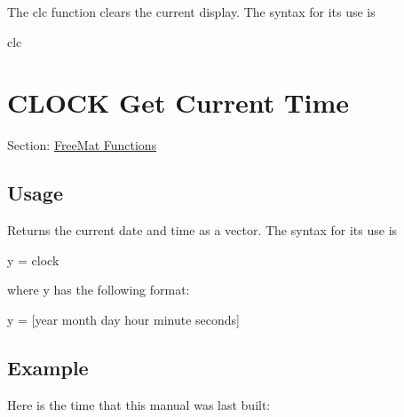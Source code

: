 The {\ttfamily clc} function clears the current display. The syntax for its use is \begin{DoxyVerb}   clc
\end{DoxyVerb}
 \hypertarget{freemat_clock}{}\section{C\-L\-O\-C\-K Get Current Time}\label{freemat_clock}
Section\-: \hyperlink{sec_freemat}{Free\-Mat Functions} \hypertarget{vtkwidgets_vtkxyplotwidget_Usage}{}\subsection{Usage}\label{vtkwidgets_vtkxyplotwidget_Usage}
Returns the current date and time as a vector. The syntax for its use is \begin{DoxyVerb}   y = clock
\end{DoxyVerb}
 where {\ttfamily y} has the following format\-: \begin{DoxyVerb}   y = [year month day hour minute seconds]
\end{DoxyVerb}
 \hypertarget{variables_struct_Example}{}\subsection{Example}\label{variables_struct_Example}
Here is the time that this manual was last built\-:


